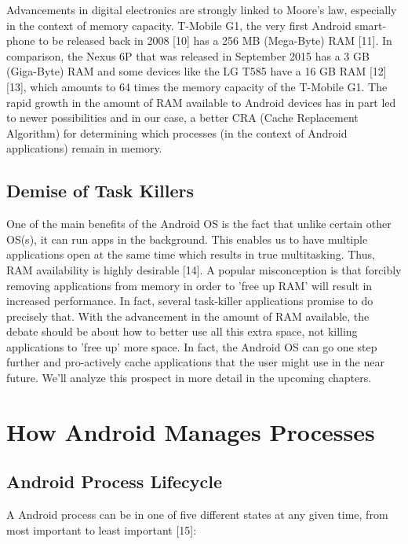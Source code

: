 \documentclass[12pt]{uthesis-v12}  %
\begin{document}
				Advancements in digital electronics are strongly linked to Moore's law, especially in the context of memory capacity. T-Mobile G1, the very first Android smart-phone to be released back in 2008 [10] has a 256 MB (Mega-Byte) RAM [11]. In comparison, the Nexus 6P that was released in September 2015 has a 3 GB (Giga-Byte) RAM and some devices like the LG T585 have a 16 GB RAM [12][13], which amounts to 64 times the memory capacity of the T-Mobile G1. The rapid growth in the amount of RAM available to Android devices has in part led to newer possibilities and in our case, a better CRA (Cache Replacement Algorithm) for determining which processes (in the context of Android applications) remain in memory.
			 	
		\subsection{Demise of Task Killers}
			One of the main benefits of the Android OS is the fact that unlike certain other OS(s), it can run apps in the background. This enables us to have multiple applications open at the same time which results in true multitasking. Thus, RAM availability is highly desirable [14]. A popular misconception is that forcibly removing applications from memory in order to 'free up RAM' will result in increased performance. In fact, several task-killer applications promise to do precisely that. With the advancement in the amount of RAM available, the debate should be about how to better use all this extra space, not killing applications to 'free up' more space. In fact, the Android OS can go one step further and pro-actively cache applications that the user might use in the near future. We'll analyze this prospect in more detail in the upcoming chapters.  
			
	\section{How Android Manages Processes}
		
		\subsection{Android Process Lifecycle}
			A Android process can be in one of five different states at any given time, from most important to least important [15]:
			
\end{document}
